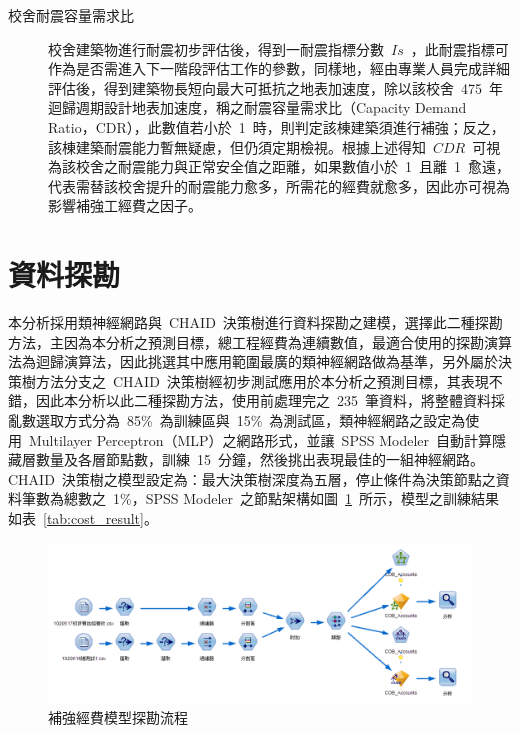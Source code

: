 \begin{description}
  \item[校舍耐震容量需求比]
  \cite{ncree09026}校舍建築物進行耐震初步評估後，得到一耐震指標分數~$Is$~，此耐震指標可作為是否需進入下一階段評估工作的參數，同樣地，經由專業人員完成詳細評估後，得到建築物長短向最大可抵抗之地表加速度，除以該校舍~475~年迴歸週期設計地表加速度，稱之耐震容量需求比（Capacity Demand Ratio，CDR），此數值若小於~1~時，則判定該棟建築須進行補強；反之，該棟建築耐震能力暫無疑慮，但仍須定期檢視。根據上述得知~$CDR$~可視為該校舍之耐震能力與正常安全值之距離，如果數值小於~1~且離~1~愈遠，代表需替該校舍提升的耐震能力愈多，所需花的經費就愈多，因此亦可視為影響補強工經費之因子。
\end{description}

\section{資料探勘}

本分析採用類神經網路與~CHAID~決策樹進行資料探勘之建模，選擇此二種探勘方法，主因為本分析之預測目標，總工程經費為連續數值，最適合使用的探勘演算法為迴歸演算法，因此挑選其中應用範圍最廣的類神經網路做為基準，另外屬於決策樹方法分支之~CHAID~決策樹經初步測試應用於本分析之預測目標，其表現不錯，因此本分析以此二種探勘方法，使用前處理完之~235~筆資料，將整體資料採亂數選取方式分為~85\%~為訓練區與~15\%~為測試區，類神經網路之設定為使用~Multilayer Perceptron（MLP）之網路形式，並讓~SPSS Modeler~自動計算隱藏層數量及各層節點數，訓練~15~分鐘，然後挑出表現最佳的一組神經網路。CHAID~決策樹之模型設定為：最大決策樹深度為五層，停止條件為決策節點之資料筆數為總數之~1\%，SPSS Modeler~之節點架構如圖~\ref{fig:cob-flow}~所示，模型之訓練結果如表~\ref{tab:cost_result}。

\begin{figure}[hbtp]
  \begin{center}
    \includegraphics[width=1.0\textwidth]{figures/cob-flow.png}
    \caption{補強經費模型探勘流程} 
    \label{fig:cob-flow}
  \end{center}
\end{figure}

